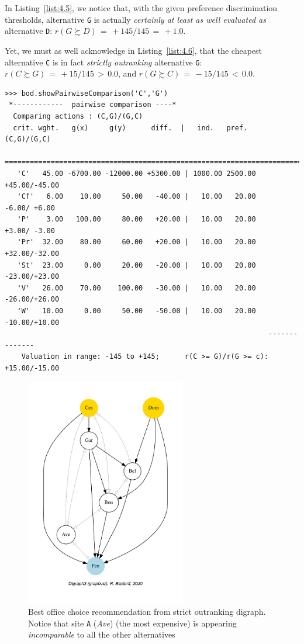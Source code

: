 In Listing~\vref{list:4.5}, we notice that, with the given preference discrimination thresholds, alternative \texttt{G} is actually \emph{certainly at least as well evaluated as} alternative \texttt{D}:  $r(G \succsim D)\, = \, +145/145\, =\, +1.0$.

Yet, we must as well acknowledge in Listing~\vref{list:4.6}, that the cheapest alternative \texttt{C} is in fact \emph{strictly outranking} alternative \texttt{G}:  $r(C \succsim G)\, =\, +15/145\, >\, 0.0$, and $r(G \succsim C)\, =\, -15/145 \,<\, 0.0$.
\begin{lstlisting}[caption={Inspecting pairwise comparison between alternatives \texttt{C} and \texttt{G}},label=list:4.6,basicstyle=\ttfamily\scriptsize]
>>> bod.showPairwiseComparison('C','G')
 *------------  pairwise comparison ----*
  Comparing actions : (C,G)/(G,C)
  crit. wght.   g(x)     g(y)      diff.  |   ind.   pref.       (C,G)/(G,C)
   ==========================================================================
   'C'   45.00 -6700.00 -12000.00 +5300.00 | 1000.00 2500.00    +45.00/-45.00 
   'Cf'   6.00    10.00     50.00   -40.00 |   10.00   20.00     -6.00/ +6.00 
   'P'    3.00   100.00     80.00   +20.00 |   10.00   20.00     +3.00/ -3.00 
   'Pr'  32.00    80.00     60.00   +20.00 |   10.00   20.00    +32.00/-32.00 
   'St'  23.00     0.00     20.00   -20.00 |   10.00   20.00    -23.00/+23.00 
   'V'   26.00    70.00    100.00   -30.00 |   10.00   20.00    -26.00/+26.00 
   'W'   10.00     0.00     50.00   -50.00 |   10.00   20.00    -10.00/+10.00
                                                               --------------
    Valuation in range: -145 to +145;      r(C >= G)/r(G >= c): +15.00/-15.00
\end{lstlisting}
\begin{figure}[ht]
\sidecaption[t]
\includegraphics[width=7cm]{Figures/4-3-bestOfficeChoice.pdf}
\caption{Best office choice recommendation from strict outranking digraph. Notice that site \texttt{A} (\emph{Ave}) (the most expensive) is appearing \emph{incomparable} to all the other alternatives}
\label{fig:4.3}       %
\end{figure}

